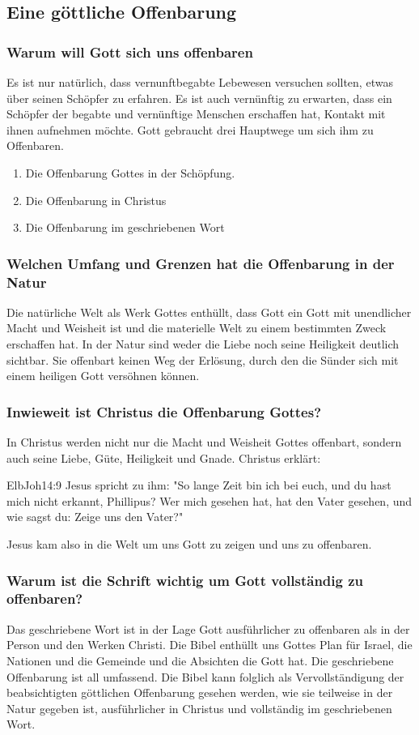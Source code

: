 \subsection{Eine göttliche Offenbarung}
\subsubsection{Warum will Gott sich uns offenbaren}
Es ist nur natürlich, dass vernunftbegabte Lebewesen versuchen sollten, etwas über seinen Schöpfer zu erfahren. Es ist auch vernünftig zu erwarten, dass ein Schöpfer der begabte und vernünftige Menschen erschaffen hat, Kontakt mit ihnen aufnehmen möchte. Gott gebraucht drei Hauptwege um sich ihm zu Offenbaren.
\begin{enumerate}
	\item Die Offenbarung Gottes in der Schöpfung.
	\item Die Offenbarung in Christus
	\item Die Offenbarung im geschriebenen Wort
\end{enumerate}
\subsubsection{Welchen Umfang und Grenzen hat die Offenbarung in der Natur}
Die natürliche Welt als Werk Gottes enthüllt, dass Gott ein Gott mit unendlicher Macht und Weisheit ist und die materielle Welt zu einem bestimmten Zweck erschaffen hat. In der Natur sind weder die Liebe noch seine Heiligkeit deutlich sichtbar. Sie offenbart keinen Weg der Erlösung, durch den die Sünder sich mit einem heiligen Gott versöhnen können.
\subsubsection{Inwieweit ist Christus die Offenbarung Gottes?}
In Christus werden nicht nur die Macht und Weisheit Gottes offenbart, sondern auch seine Liebe, Güte, Heiligkeit und Gnade. Christus erklärt:
\begin{bibeltext}{Elb}{Joh}{14:9}
	Jesus spricht zu ihm: "So lange Zeit bin ich bei euch, und du hast mich nicht erkannt, Phillipus? Wer mich gesehen hat, hat den Vater gesehen, und wie sagst du: Zeige uns den Vater?"
\end{bibeltext} 
Jesus kam also in die Welt um uns Gott zu zeigen und uns zu offenbaren.
\subsubsection{Warum ist die Schrift wichtig um Gott vollständig zu offenbaren?}
Das geschriebene Wort ist in der Lage Gott ausführlicher zu offenbaren als in der Person und den Werken Christi. Die Bibel enthüllt uns Gottes Plan für Israel, die Nationen und die Gemeinde und die Absichten die Gott hat. Die geschriebene Offenbarung ist all umfassend. Die Bibel kann folglich als Vervollständigung der beabsichtigten göttlichen Offenbarung gesehen werden, wie sie teilweise in der Natur gegeben ist, ausführlicher in Christus und vollständig im geschriebenen Wort. 



